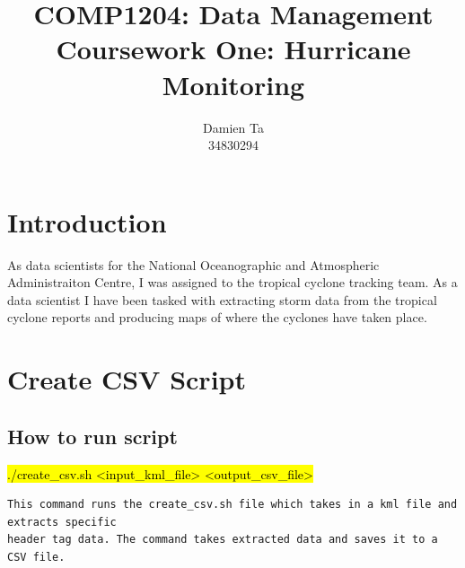 \documentclass[]{article}
\title{COMP1204: Data Management \\ Coursework One: Hurricane Monitoring }
\author{Damien Ta \\ 34830294}
\begin{document}
\maketitle

\section{Introduction}
As data scientists for the National Oceanographic and Atmospheric Administraiton Centre, I was assigned to the tropical cyclone
tracking team. As a data scientist I have been tasked with extracting storm data from the tropical cyclone reports and producing
maps of where the cyclones have taken place.
\clearpage
\section{Create CSV Script}
\subsection{How to run script}
\begin{tcolorbox}[colback=white, colframe=black, boxrule=0.5pt, arc=2mm, 
    title=Script to run create\_csv.sh, width=6.7in, fonttitle=\bfseries, listing only, listing options={language=sh, basicstyle=\ttfamily}]
\hl{./create\_csv.sh <input\_kml\_file> <output\_csv\_file>}
\begin{verbatim}
This command runs the create_csv.sh file which takes in a kml file and extracts specific
header tag data. The command takes extracted data and saves it to a CSV file.
\end{verbatim}
\end{tcolorbox}
\end{document}
